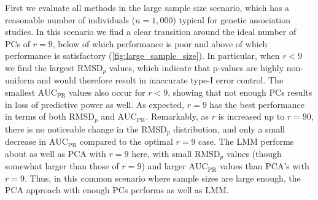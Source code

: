 \documentclass[11pt]{article}
\newcommand{\rmsd}{\text{RMSD}_p}
\newcommand{\auc}{\text{AUC}_\text{PR}}
\begin{document}
First we evaluate all methods in the large sample size scenario, which has a reasonable number of individuals ($n = 1,000$) typical for genetic association studies.
In this scenario we find a clear transition around the ideal number of PCs of $r = 9$, below of which performance is poor and above of which performance is satisfactory (\cref{fig:large_sample_size}).
In particular, when $r < 9$ we find the largest $\rmsd$ values, which indicate that p-values are highly non-uniform and would therefore result in inaccurate type-I error control.
The smallest $\auc$ values also occur for $r < 9$, showing that not enough PCs results in loss of predictive power as well.
As expected, $r = 9$ has the best performance in terms of both $\rmsd$ and $\auc$.
Remarkably, as $r$ is increased up to $r = 90$, there is no noticeable change in the $\rmsd$ distribution, and only a small decrease in $\auc$ compared to the optimal $r = 9$ case.
The LMM performs about as well as PCA with $r = 9$ here, with small $\rmsd$ values (though somewhat larger than those of $r=9$) and larger $\auc$ values than PCA's with $r=9$.
Thus, in this common scenario where sample sizes are large enough, the PCA approach with enough PCs performs as well as LMM.
\end{document}

